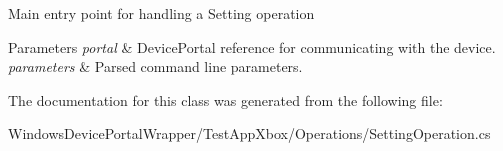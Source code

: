 Main entry point for handling a Setting operation 


\begin{DoxyParams}{Parameters}
{\em portal} & Device\+Portal reference for communicating with the device.\\
\hline
{\em parameters} & Parsed command line parameters.\\
\hline
\end{DoxyParams}


The documentation for this class was generated from the following file\+:\begin{DoxyCompactItemize}
\item 
Windows\+Device\+Portal\+Wrapper/\+Test\+App\+Xbox/\+Operations/Setting\+Operation.\+cs\end{DoxyCompactItemize}
